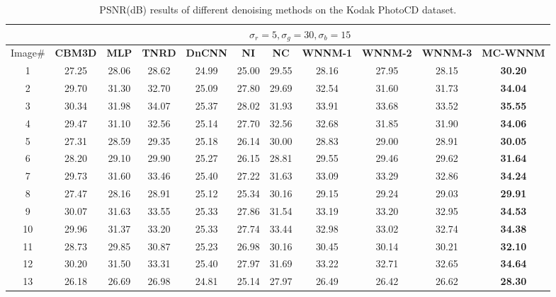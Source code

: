 \documentclass[10pt,onecolumn,letterpaper]{article}
\begin{document}
\vspace{5mm}
\begin{table}[!htbp]
\caption{PSNR(dB) results of different denoising methods on the Kodak PhotoCD dataset.}
\label{t3}
\begin{center}
\renewcommand\arraystretch{1.0}
\footnotesize
\begin{tabular}{|c||c|c|c|c|c|c|c|c|c|c|}
\hline
&\multicolumn{10}{c|}{ $\sigma_{r} = 5, \sigma_{g} = 30, \sigma_{b} = 15$}
\\
\hline
\hline
Image\#
&
\textbf{CBM3D} \cite{cbm3d}
&
\textbf{MLP} \cite{mlp}
&
\textbf{TNRD} \cite{chen2015learning}
&
\textbf{DnCNN} \cite{dncnn}
&
\textbf{NI} \cite{neatimage}
&
\textbf{NC} \cite{noiseclinic}
&
\textbf{WNNM-1} \cite{wnnm}
&
\textbf{WNNM-2}
&
\textbf{WNNM-3}
&
\textbf{MC-WNNM}
\\
\hline
1& 27.25 & 28.06 & 28.62 & 24.99 & 25.00 & 29.55 & 28.16 & 27.95 & 28.15 & \textbf{30.20}
\\
\hline
2& 29.70 & 31.30 & 32.70 & 25.09 & 27.80 & 29.69 & 32.54 & 31.60 & 31.73 & \textbf{34.04}
\\
\hline
3& 30.34 & 31.98 & 34.07 & 25.37 & 28.02 & 31.93 & 33.91 & 33.68 & 33.52 & \textbf{35.55}
\\
\hline 
4& 29.47 & 31.10 & 32.56 & 25.14 & 27.70 & 32.56 & 32.68 & 31.85 & 31.90 & \textbf{34.06} 
\\
\hline
5& 27.31 & 28.59 & 29.35 & 25.18 & 26.14 & 30.00 & 28.83 & 29.00 & 28.91 & \textbf{30.05}
\\
\hline
6& 28.20 & 29.10 & 29.90 & 25.27 & 26.15 & 28.81 & 29.55 & 29.46 & 29.62 & \textbf{31.64}
\\
\hline
7& 29.73 & 31.60 & 33.46 & 25.40 & 27.22 & 31.63 & 33.09 & 33.29 & 32.86 & \textbf{34.24} 
\\
\hline
8& 27.47 & 28.16 & 28.91 & 25.12 & 25.34 & 30.16 & 29.15 & 29.24 & 29.03 & \textbf{29.91}
\\
\hline
9& 30.07 & 31.63 & 33.55 & 25.33 & 27.86 & 31.54 & 33.19 & 33.20 & 32.95 & \textbf{34.53}
\\
\hline
10& 29.96 & 31.37 & 33.20 & 25.33 & 27.74 & 33.44 & 32.98 & 33.02 & 32.74 & \textbf{34.38}
\\
\hline
11& 28.73 & 29.85 & 30.87 & 25.23 & 26.98 & 30.16 & 30.45 & 30.14 & 30.21 & \textbf{32.10}
\\
\hline
12& 30.20 & 31.50 & 33.31 & 25.40 & 27.97 & 31.69 & 33.22 & 32.71 & 32.65 & \textbf{34.64}
\\
\hline
13& 26.18 & 26.69 & 26.98 & 24.81 & 25.14 & 27.97 & 26.49 & 26.42 & 26.62 & \textbf{28.30}

\end{tabular}
\end{center}
\end{table}
\end{document}
